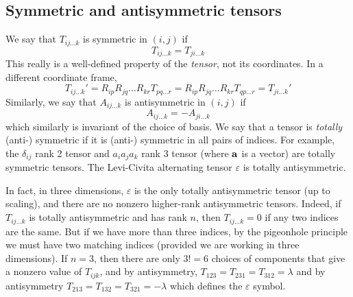 \subsection{Symmetric and antisymmetric tensors}
We say that \(T_{ij\dots k}\) is symmetric in \((i, j)\) if
\[
	T_{ij\dots k} = T_{ji\dots k}
\]
This really is a well-defined property of the \textit{tensor}, not its coordinates.
In a different coordinate frame,
\[
	T_{ij\dots k}' = R_{ip}R_{jq}\dots R_{kr} T_{pq\dots r} = R_{ip}R_{jq}\dots R_{kr} T_{qp\dots r} = T_{ji\dots k}'
\]
Similarly, we say that \(A_{ij\dots k}\) is antisymmetric in \((i, j)\) if
\[
	A_{ij\dots k} = -A_{ji\dots k}
\]
which similarly is invariant of the choice of basis.
We say that a tensor is \textit{totally} (anti-) symmetric if it is (anti-) symmetric in all pairs of indices.
For example, the \(\delta_{ij}\) rank 2 tensor and \(a_i a_j a_k\) rank 3 tensor (where \(\vb a\) is a vector) are totally symmetric tensors.
The Levi-Civita alternating tensor \(\varepsilon\) is totally antisymmetric.

In fact, in three dimensions, \(\varepsilon\) is the only totally antisymmetric tensor (up to scaling), and there are no nonzero higher-rank antisymmetric tensors.
Indeed, if \(T_{ij\dots k}\) is totally antisymmetric and has rank \(n\), then \(T_{ij\dots k} = 0\) if any two indices are the same.
But if we have more than three indices, by the pigeonhole principle we must have two matching indices (provided we are working in three dimensions).
If \(n=3\), then there are only \(3!
= 6\) choices of components that give a nonzero value of \(T_{ijk}\), and by antisymmetry, \(T_{123} = T_{231} = T_{312} = \lambda\) and by antisymmetry \(T_{213} = T_{132} = T_{321} = -\lambda\) which defines the \(\varepsilon\) symbol.
